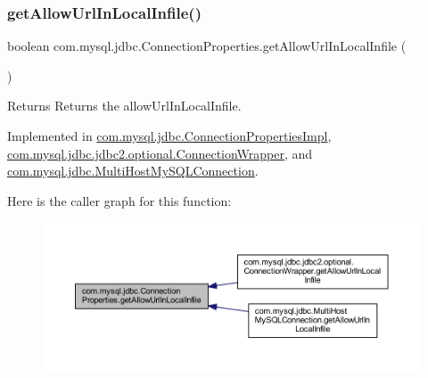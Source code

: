 \subsubsection{\texorpdfstring{get\+Allow\+Url\+In\+Local\+Infile()}{getAllowUrlInLocalInfile()}}
{\footnotesize\ttfamily boolean com.\+mysql.\+jdbc.\+Connection\+Properties.\+get\+Allow\+Url\+In\+Local\+Infile (\begin{DoxyParamCaption}{ }\end{DoxyParamCaption})}

\begin{DoxyReturn}{Returns}
Returns the allow\+Url\+In\+Local\+Infile. 
\end{DoxyReturn}


Implemented in \mbox{\hyperlink{classcom_1_1mysql_1_1jdbc_1_1_connection_properties_impl_ac1a9cc94289786bd8b327902faf33d73}{com.\+mysql.\+jdbc.\+Connection\+Properties\+Impl}}, \mbox{\hyperlink{classcom_1_1mysql_1_1jdbc_1_1jdbc2_1_1optional_1_1_connection_wrapper_a16443b33fa3689cee078616f0a58f29a}{com.\+mysql.\+jdbc.\+jdbc2.\+optional.\+Connection\+Wrapper}}, and \mbox{\hyperlink{classcom_1_1mysql_1_1jdbc_1_1_multi_host_my_s_q_l_connection_a53db1b48cd5ab66d570f369452f7295a}{com.\+mysql.\+jdbc.\+Multi\+Host\+My\+S\+Q\+L\+Connection}}.

Here is the caller graph for this function\+:\nopagebreak
\begin{figure}[H]
\begin{center}
\leavevmode
\includegraphics[width=350pt]{interfacecom_1_1mysql_1_1jdbc_1_1_connection_properties_aa0b1ef6e51c18b41376c5651833f11b8_icgraph}
\end{center}
\end{figure}
\mbox{\label{interfacecom_1_1mysql_1_1jdbc_1_1_connection_properties_a157a33612cbef9f88801ad8f2a4209b4}} 
